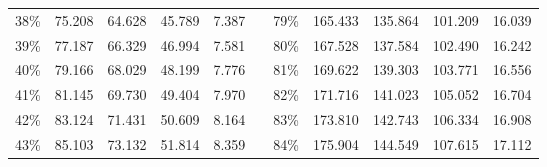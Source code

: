 \documentclass[12pt]{article}
\begin{document}
\begin{center}
\begin{tabular}{|c|r|r|r|r|r|c|r|r|r|r|}
    38\%                      & 75.208                             & 64.628                              & 45.789                              & 7.387                              &                                & 79\%                      & 165.433                            & 135.864                             & 101.209                             & 16.039                             \\ \cline{1-5} \cline{7-11} 
    39\%                      & 77.187                             & 66.329                              & 46.994                              & 7.581                              &                                & 80\%                      & 167.528                            & 137.584                             & 102.490                             & 16.242                             \\ \cline{1-5} \cline{7-11} 
    40\%                      & 79.166                             & 68.029                              & 48.199                              & 7.776                              &                                & 81\%                      & 169.622                            & 139.303                             & 103.771                             & 16.556                             \\ \cline{1-5} \cline{7-11} 
    41\%                      & 81.145                             & 69.730                              & 49.404                              & 7.970                              &                                & 82\%                      & 171.716                            & 141.023                             & 105.052                             & 16.704                             \\ \cline{1-5} \cline{7-11} 
    42\%                      & 83.124                             & 71.431                              & 50.609                              & 8.164                              &                                & 83\%                      & 173.810                            & 142.743                             & 106.334                             & 16.908                             \\ \cline{1-5} \cline{7-11} 
    43\%                      & 85.103                             & 73.132                              & 51.814                              & 8.359                              &                                & 84\%                      & 175.904                            & 144.549                             & 107.615                             & 17.112                             \\ \cline{1-5} \cline{7-11} 

\end{tabular}
\end{center}
\end{document}
